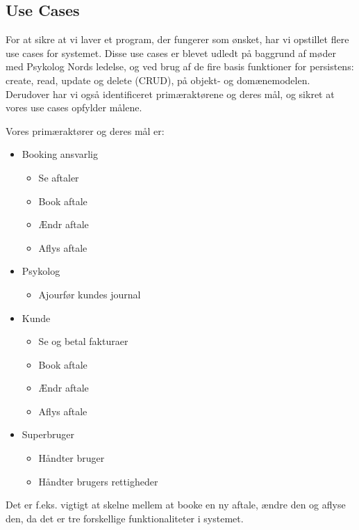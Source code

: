 \subsection{Use Cases}
\label{UseCases}
For at sikre at vi laver et program, der fungerer som ønsket, har vi opstillet flere use cases for systemet.
Disse use cases er blevet udledt på baggrund af møder med Psykolog Nords ledelse, og ved brug af de fire basis funktioner for persistens: create, read, update og delete (CRUD), på objekt- og domænemodelen.
Derudover har vi også identificeret primæraktørene og deres mål, og sikret at vores use cases opfylder målene.

Vores primæraktører og deres mål er:

\begin{itemize}
    \item Booking ansvarlig
        \begin{itemize}
            \item Se aftaler
            \item Book aftale
            \item Ændr aftale
            \item Aflys aftale
        \end{itemize}
    \item Psykolog
        \begin{itemize}
            \item Ajourfør kundes journal
        \end{itemize}
    \item Kunde
        \begin{itemize}
            \item Se og betal fakturaer
            \item Book aftale
            \item Ændr aftale
            \item Aflys aftale
        \end{itemize}
    \item Superbruger
        \begin{itemize}
            \item Håndter bruger
            \item Håndter brugers rettigheder
        \end{itemize}

\end{itemize}

Det er f.eks. vigtigt at skelne mellem at booke en ny aftale, ændre den og aflyse den, da det er tre forskellige funktionaliteter i systemet.


